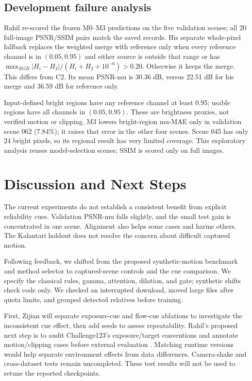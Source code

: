 \documentclass{article}
\begin{document}
\subsection{Development failure analysis}
Rahil re-scored the frozen M0--M3 predictions on the five validation scenes; all 20 full-image PSNR/SSIM pairs match the saved records. His separate whole-pixel fallback replaces the weighted merge with reference only when every reference channel is in $(0.05,0.95)$ and either source is outside that range or has $\max_{RGB}|H_i-H_2|/(H_i+H_2+10^{-6})>0.20$. Otherwise it keeps the merge. This differs from C2. Its mean PSNR-mu is 30.36 dB, versus 22.51 dB for his merge and 36.59 dB for reference only.

Input-defined bright regions have any reference channel at least 0.95; usable regions have all channels in $(0.05,0.95)$. These are brightness proxies, not verified motion or clipping. M3 lowers bright-region mu-MAE only in validation scene 062 (7.84\%); it raises that error in the other four scenes. Scene 045 has only 24 bright pixels, so its regional result has very limited coverage. This exploratory analysis reuses model-selection scenes; SSIM is scored only on full images.

\section{Discussion and Next Steps}
The current experiments do not establish a consistent benefit from explicit reliability cues. Validation PSNR-mu falls slightly, and the small test gain is concentrated in one scene. Alignment also helps some cases and harms others. The Kalantari holdout does not resolve the concern about difficult captured motion.

Following feedback, we shifted from the proposed synthetic-motion benchmark and method selector to captured-scene controls and the cue comparison. We specify the classical rules, gamma, attention, dilation, and gate; synthetic shifts check code only. We checked an interrupted download, moved large files after quota limits, and grouped detected relatives before training.

First, Zijian will separate exposure-cue and flow-cue ablations to investigate the inconsistent cue effect, then add seeds to assess repeatability. Rahil's proposed next step is to audit Challenge123's exposure/target conventions and annotate motion/clipping cases before external evaluation \citep{kong2024}. Matching runtime versions would help separate environment effects from data differences. Camera-shake and cross-dataset tests remain uncompleted. These test results will not be used to retune the reported checkpoints.
\end{document}
